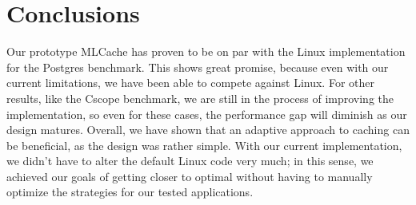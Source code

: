 \section{Conclusions}

Our prototype MLCache has proven to be on par with the Linux implementation for the Postgres benchmark. This shows great promise, because even with our current limitations, we have been able to compete against Linux. For other results, like the Cscope benchmark, we are still in the process of improving the implementation, so even for these cases, the performance gap will diminish as our design matures. Overall, we have shown that an adaptive approach to caching can be beneficial, as the design was rather simple. With our current implementation, we didn't have to alter the default Linux code very much; in this sense, we achieved our goals of getting closer to optimal without having to manually optimize the strategies for our tested applications.
